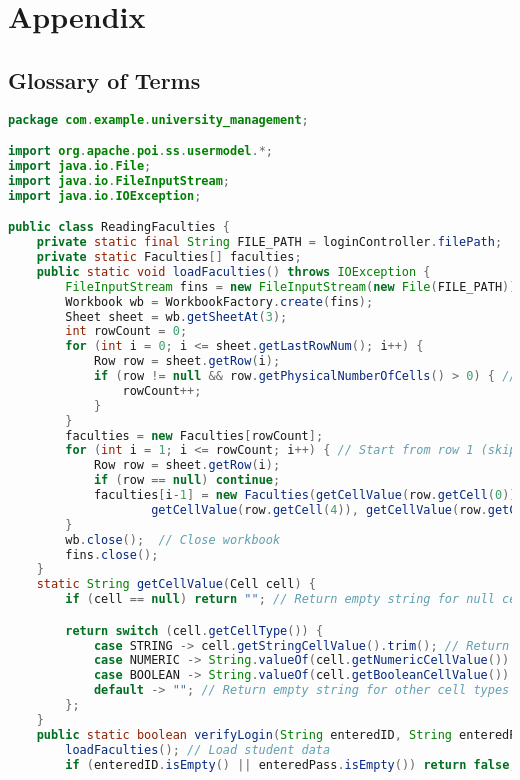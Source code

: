 \newpage
\section{Appendix}


\subsection{Glossary of Terms}

\begin{lstlisting}[language=Java]
package com.example.university_management;

import org.apache.poi.ss.usermodel.*;
import java.io.File;
import java.io.FileInputStream;
import java.io.IOException;

public class ReadingFaculties {
    private static final String FILE_PATH = loginController.filePath;
    private static Faculties[] faculties;
    public static void loadFaculties() throws IOException {
        FileInputStream fins = new FileInputStream(new File(FILE_PATH));
        Workbook wb = WorkbookFactory.create(fins);
        Sheet sheet = wb.getSheetAt(3);
        int rowCount = 0;
        for (int i = 0; i <= sheet.getLastRowNum(); i++) {
            Row row = sheet.getRow(i);
            if (row != null && row.getPhysicalNumberOfCells() > 0) { // Check if the row has actual cells
                rowCount++;
            }
        }
        faculties = new Faculties[rowCount];
        for (int i = 1; i <= rowCount; i++) { // Start from row 1 (skip header)
            Row row = sheet.getRow(i);
            if (row == null) continue;
            faculties[i-1] = new Faculties(getCellValue(row.getCell(0)), getCellValue(row.getCell(1)), getCellValue(row.getCell(2)), getCellValue(row.getCell(3)),
                    getCellValue(row.getCell(4)), getCellValue(row.getCell(5)), getCellValue(row.getCell(6)), getCellValue(row.getCell(7)));
        }
        wb.close();  // Close workbook
        fins.close();
    }
    static String getCellValue(Cell cell) {
        if (cell == null) return ""; // Return empty string for null cells

        return switch (cell.getCellType()) {
            case STRING -> cell.getStringCellValue().trim(); // Return string value
            case NUMERIC -> String.valueOf(cell.getNumericCellValue()).trim(); // Convert numeric value to string
            case BOOLEAN -> String.valueOf(cell.getBooleanCellValue()).trim(); // Convert boolean to string
            default -> ""; // Return empty string for other cell types
        };
    }
    public static boolean verifyLogin(String enteredID, String enteredPass) throws IOException {
        loadFaculties(); // Load student data
        if (enteredID.isEmpty() || enteredPass.isEmpty()) return false; // Reject empty credentials


\end{lstlisting}
